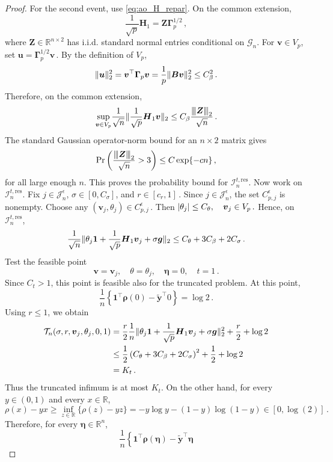 \documentclass{article}
\makeatletter
\theoremstyle{definition}
\newcommand{\vnorm}[1]{%
	\ensuremath{%
		\if@display
		\left\| #1 \right\|
		\else
		\| #1 \|
		\fi
	}%
}
\newcommand{\abs}[1]{%
	\ensuremath{%
		\if@display
		\left| #1 \right|
		\else
		\lvert #1 \rvert
		\fi
	}%
}
\newcommand{\mnorm}[1]{{\left\vert\kern-0.25ex\left\vert\kern-0.25ex\left\vert #1
		\right\vert\kern-0.25ex\right\vert\kern-0.25ex\right\vert}}
\newcommand*{\bb}{\boldsymbol}
\def\bH {\bb{H}}
\def\bu{\bb{u}}
\def\bv{\bb{v}}
\def\bg{\bb{g}}
\def\bYtil{\widetilde{\bb{y}}}
\def\bB{\bb{B}}
\def\bH{\bb{H}}
\makeatother
\begin{document}
\begin{bibunit}
\begin{proof}
	For the second event, use \eqref{eq:ao_H_repar}. On the common
	extension,
	$$
		\frac1{\sqrt p}\bH_1
		=
		\bb Z\bb\Gamma_p^{1/2}\,,
	$$
	where $\bb Z\in\mathbb R^{n\times2}$ has i.i.d. standard normal entries
	conditional on $\mathcal G_n$.
	For $\bv\in V_p$, set $\bu=\bb\Gamma_p^{1/2}\bv \,.$
	By the definition of $V_p$,
	$$
		\vnorm{\bu}_2^2
		=
		\bv^\top\bb\Gamma_p\bv
		=
		\frac1p\vnorm{\bB\bv}_2^2
		\leq
		C_\beta^2 \,.
	$$
	Therefore, on the common extension,
	$$
		\underset{\bv\in V_p}{\sup}
		\frac1{\sqrt n}
		\vnorm{
			\frac1{\sqrt p}\bH_1\bv
		}_2
		\leq
		C_\beta
		\frac{\mnorm{\bb Z}_2}{\sqrt n}\,.
	$$
	The standard Gaussian operator-norm bound for an $n\times2$ matrix gives
	$$
		\Pr\left(
			\frac{\mnorm{\bb Z}_2}{\sqrt n}>3
			\right)
			\leq
			C\exp\{-cn\}\,,
		$$
	for all large enough $n$. This proves the probability bound for
	$\mathcal I_{n}^{t,\mathrm{res}}$.
	Now work on $\mathcal I_{n}^{t,\mathrm{res}}$. Fix $j\in\mathcal J_n^\epsilon$, $\sigma\in[0,C_\sigma]$, and $r\in[c_r,1]\,.$
	Since $j\in\mathcal J_n^\epsilon$, the set $C_{p,j}^{\epsilon}$ is
	nonempty. Choose any $(\bv_j,\theta_j)\in C_{p,j}^{\epsilon}\,.$
	Then $\abs{\theta_j}\leq C_\theta, \quad \bv_j\in V_p\,.$
	Hence, on $\mathcal I_{n}^{t,\mathrm{res}}$,
	$$
		\frac1{\sqrt n}
		\vnorm{
			\theta_j\bb1
			+
			\frac1{\sqrt p}\bH_1\bv_j
			+
			\sigma\bg
		}_2
		\leq
		C_\theta+3C_\beta+2C_\sigma \,.
	$$
	Test the feasible point
	$$
		\bv=\bv_j,
		\quad
		\theta=\theta_j,
		\quad
		\bb\eta=0,
		\quad
		t=1\,.
	$$
	Since $C_t>1$, this point is feasible also for the truncated problem.
	At this point,
	$$
		\frac1n
		\left\{
			\bb1^\top\bb\rho(0)-\bYtil^\top0
		\right\}
		=
		\log2\,.
	$$
	Using $r\leq1$, we obtain
	$$
	\begin{aligned}
		\mathcal T_n(\sigma,r,\bv_j,\theta_j,0,1)
		&=
		\frac r2
		\frac1n
		\vnorm{
			\theta_j\bb1
			+
			\frac1{\sqrt p}\bH_1\bv_j
			+
			\sigma\bg
		}_2^2
		+
		\frac r2
		+
		\log2
		\\
		&\leq
		\frac12
		\left(
			C_\theta+3C_\beta+2C_\sigma
		\right)^2
		+
		\frac12
		+
		\log2
		\\
		&=
		K_t\,.
	\end{aligned}
	$$
	Thus the truncated infimum is at most $K_t$.
	On the other hand, for every $y\in(0,1)$ and every $x\in\mathbb R$,
	$$
		\rho(x)-yx
		\geq
		\underset{z\in\mathbb R}{\inf}\{\rho(z)-yz\}
		=
		-y\log y -(1-y)\log(1-y) \in [0, \log(2)]\,.
	$$
	Therefore, for every $\bb\eta\in\mathbb R^n$,
	$$
		\frac1n
		\left\{
			\bb1^\top\bb\rho(\bb\eta)
			-
			\bYtil^\top\bb\eta
$$
\end{proof}
\end{bibunit}
\end{document}
